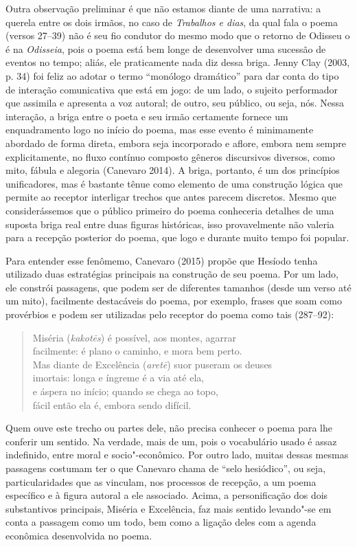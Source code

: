 Outra observação preliminar é que não estamos diante de uma narrativa: a
querela entre os dois irmãos, no caso de \textit{Trabalhos e dias}, da qual fala o poema (versos 27--39) não é
seu fio condutor do mesmo modo que o retorno de Odisseu o é na
\emph{Odisseia}, pois o poema está bem longe de desenvolver uma sucessão
de eventos no tempo; aliás, ele praticamente nada diz dessa briga. Jenny
Clay (2003, p. 34) foi feliz ao adotar o termo ``monólogo dramático''
para dar conta do tipo de interação comunicativa que está em jogo: de um
lado, o sujeito performador que assimila e apresenta a voz autoral; de
outro, seu público, ou seja, nós. Nessa interação, a briga entre o poeta
e seu irmão certamente fornece um enquadramento logo no início do poema,
mas esse evento é minimamente abordado de forma direta, embora seja
incorporado e aflore, embora nem sempre explicitamente, no fluxo
contínuo composto gêneros discursivos diversos, como mito, fábula e
alegoria (Canevaro 2014). A briga, portanto, é um dos princípios
unificadores, mas é bastante tênue como elemento de uma construção
lógica que permite ao receptor interligar trechos que antes parecem
discretos. Mesmo que considerássemos que o público primeiro do poema
conheceria detalhes de uma suposta briga real entre duas figuras
históricas, isso provavelmente não valeria para a recepção posterior do
poema, que logo e durante muito tempo foi popular.

Para entender esse fenômemo, Canevaro (2015) propõe que Hesíodo tenha
utilizado duas estratégias principais na construção de seu poema. Por um
lado, ele constrói passagens, que podem ser de diferentes tamanhos
(desde um verso até um mito), facilmente destacáveis do poema, por
exemplo, frases que soam como provérbios e podem ser utilizadas pelo
receptor do poema como tais (287--92):

\begin{verse}
Miséria (\emph{kakotēs}) é possível, aos montes, agarrar\\
facilmente: é plano o caminho, e mora bem perto.\\
Mas diante de Excelência (\emph{aretē}) suor puseram os deuses\\
imortais: longa e íngreme é a via até ela,\\
e áspera no início; quando se chega ao topo,\\
fácil então ela é, embora sendo difícil.
\end{verse}

Quem ouve este trecho ou partes dele, não precisa conhecer o poema para
lhe conferir um sentido. Na verdade, mais de um, pois o vocabulário
usado é assaz indefinido, entre moral e socio"-econômico. Por outro lado,
muitas dessas mesmas passagens costumam ter o que Canevaro chama de
``selo hesiódico'', ou seja, particularidades que as vinculam, nos
processos de recepção, a um poema específico e à figura autoral a ele
associado. Acima, a personificação dos dois substantivos principais,
Miséria e Excelência, faz mais sentido levando"-se em conta a passagem
como um todo, bem como a ligação deles com a agenda econômica
desenvolvida no poema.